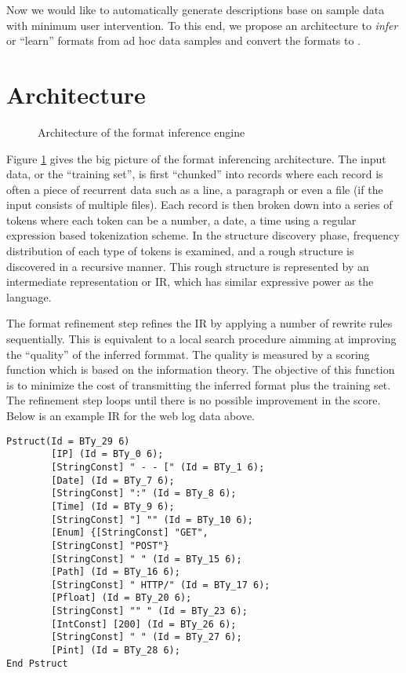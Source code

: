 \documentclass{article}
\begin{document}
Now we would like to automatically generate \padsc{} descriptions base on
sample data with minimum user intervention. To this end, 
we propose an architecture to {\em infer} or ``learn'' 
formats from ad hoc data samples and convert the formats to \padsc{}. 

\section{Architecture}
\begin{figure}
\begin{center}
\caption{Architecture of the format inference engine}
\label{fig-archi}
\end{center}
\end{figure}
Figure \ref{fig-archi} gives the big picture of the format inferencing
architecture. The input data, or the ``training set'', 
is first ``chunked'' into records where
each record is often a piece of recurrent data such as a line, 
a paragraph or even a file (if the input consists of multiple files).
Each record is then broken down into a series of tokens where each
token can be a number, a date, a time using a regular expression
based tokenization scheme. In the structure discovery phase,
frequency distribution of each type of tokens is examined, and
a rough structure is discovered in a recursive manner. This
rough structure is represented by an intermediate representation or
IR, which has similar expressive power as the \pads{} language. 

The format refinement step refines the IR by applying a number of
rewrite rules sequentially. This is equivalent to a local search
procedure aimming at improving the ``quality'' of the inferred formmat.
The quality is measured by a scoring function which is based on the
information theory. The objective of this function is to
minimize the cost of transmitting the inferred format plus the
training set. The refinement step loops until there is no possible
improvement in the score. Below is an example IR for the web log
data above.

{\small
\begin{verbatim}
Pstruct(Id = BTy_29 6)
        [IP] (Id = BTy_0 6);
        [StringConst] " - - [" (Id = BTy_1 6);
        [Date] (Id = BTy_7 6);
        [StringConst] ":" (Id = BTy_8 6);
        [Time] (Id = BTy_9 6);
        [StringConst] "] "" (Id = BTy_10 6);
        [Enum] {[StringConst] "GET", 
		[StringConst] "POST"} 
        [StringConst] " " (Id = BTy_15 6);
        [Path] (Id = BTy_16 6);
        [StringConst] " HTTP/" (Id = BTy_17 6);
        [Pfloat] (Id = BTy_20 6);
        [StringConst] "" " (Id = BTy_23 6);
        [IntConst] [200] (Id = BTy_26 6);
        [StringConst] " " (Id = BTy_27 6);
        [Pint] (Id = BTy_28 6);
End Pstruct
\end{verbatim}
}
\end{document}
